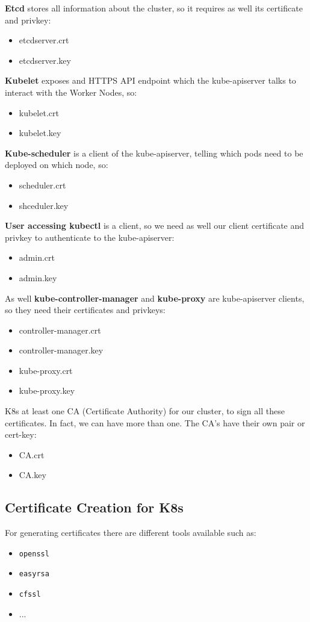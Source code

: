 \documentclass{article}
\begin{document}
\textbf{Etcd} stores all information about the cluster, so it requires as well its certificate and privkey:
\begin{itemize}
    \item etcdserver.crt
    \item etcdserver.key
\end{itemize}

\textbf{Kubelet} exposes and HTTPS API endpoint which the kube-apiserver talks to interact with the Worker Nodes, so:
\begin{itemize}
    \item kubelet.crt
    \item kubelet.key
\end{itemize}

\textbf{Kube-scheduler} is a client of the kube-apiserver, telling which pods need to be deployed on which node, so:
\begin{itemize}
    \item scheduler.crt
    \item shceduler.key
\end{itemize}

\textbf{User accessing kubectl} is a client, so we need as well our client certificate and privkey
to authenticate to the kube-apiserver:
\begin{itemize}
    \item admin.crt
    \item admin.key
\end{itemize}

As well \textbf{kube-controller-manager} and \textbf{kube-proxy} are kube-apiserver clients, so they need their certificates and privkeys:
\begin{itemize}
    \item controller-manager.crt
    \item controller-manager.key
    \item kube-proxy.crt
    \item kube-proxy.key
\end{itemize}

K8s at least one CA (Certificate Authority) for our cluster, to sign all these certificates. In fact, we can have more than one. The CA's have their own pair or cert-key:
\begin{itemize}
    \item CA.crt
    \item CA.key
\end{itemize}

\subsection{Certificate Creation for K8s}
For generating certificates there are different tools available such as:
\begin{itemize}
    \item \verb|openssl|
    \item \verb|easyrsa|
    \item \verb|cfssl|
    \item ...
\end{itemize}
\end{document}
